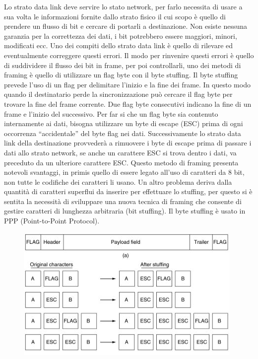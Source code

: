 Lo strato data link deve servire lo stato network, per farlo necessita di usare a sua volta le informazioni fornite dallo strato fisico il cui scopo è quello di prendere un flusso di bit e cercare di portarli a destinazione.
Non esiste nessuna garanzia per la correttezza dei dati, i bit potrebbero essere maggiori, minori, modificati ecc. Uno dei compiti dello strato data link è quello di rilevare ed eventualmente correggere questi errori.
Il modo per rinvenire questi errori è quello di suddividere il flusso dei bit in frame, per poi controllarli, uno dei metodi di framing è quello di utilizzare un flag byte con il byte stuffing.
Il byte stuffing prevede l’uso di un flag per delimitare l’inizio e la fine dei frame. In questo modo quando il destinatario perde la sincronizzazione può cercare il flag byte per trovare la fine del frame corrente. Due flag byte consecutivi indicano la fine di un frame e l’inizio del successivo.
Per far si che un flag byte sia contenuto internamente ai dati, bisogna utilizzare un byte di escape (ESC) prima di ogni occorrenza “accidentale” del byte flag nei dati. Successivamente lo strato data link della destinazione provvederà a rimuovere i byte di escape prima di passare i dati allo strato network, se anche un carattere ESC si trova dentro i dati, va preceduto da un ulteriore carattere ESC.
Questo metodo di framing presenta notevoli svantaggi, in primis quello di essere legato all’uso di caratteri da 8 bit, non tutte le codifiche dei caratteri li usano. Un altro problema deriva dalla quantità di caratteri superflui da inserire per effettuare lo stuffing, per questo si è sentita la necessità di sviluppare una nuova tecnica di framing che consente di gestire caratteri di lunghezza arbitraria (bit stuffing).
Il byte stuffing è usato in PPP (Point-to-Point Protocol).

\begin{figure}[H]
\centering
\includegraphics[scale=0.8]{res/img/13_ByteStuffing.png}
\end{figure}


